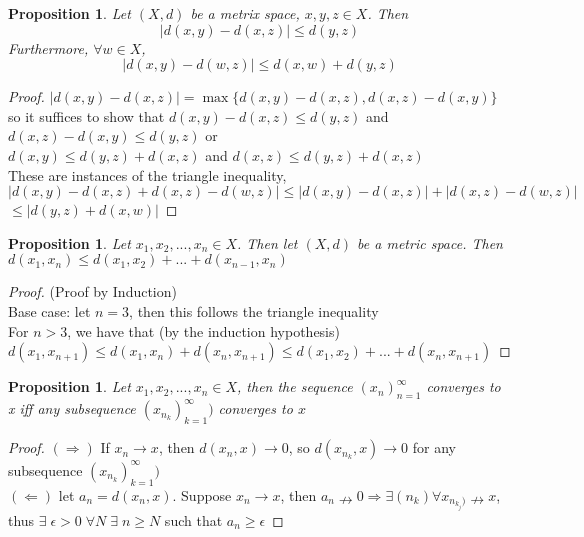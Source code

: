 \documentclass{article}
\newtheorem{proposition}[theorem]{Proposition}
\begin{document}
\begin{proposition}
    Let $(X, d)$ be a metrix space, $x, y, z \in X$. Then 
    \begin{equation}
        |d(x,y) - d(x,z)| \leq d(y,z)
    \end{equation}
    Furthermore, $\forall w \in X$,
    \begin{equation}
        |d(x,y) - d(w,z)| \leq d(x,w) + d(y,z)
    \end{equation}
\end{proposition}

\begin{proof}
    $|d(x,y) - d(x,z)| = \max\{d(x,y) - d(x,z), d(x,z) - d(x,y)\}$ so it suffices to show
    that $d(x,y) - d(x,z) \leq d(y,z)$ and $d(x,z) - d(x,y) \leq d(y,z)$ or \\
    $d(x,y) \leq d(y,z) + d(x,z)$ and $d(x,z) \leq d(y,z) + d(x,z)$ \\
    These are instances of the triangle inequality, \\
    $|d(x,y) - d(x,z) + d(x,z) -d(w,z)| \leq |d(x,y) - d(x,z)| + | d(x,z) - d(w,z)|$
    $\leq |d(y,z) + d(x,w)|$
\end{proof}

\begin{proposition}
    Let $x_1, x_2, ... , x_n \in X$. Then let $(X, d)$ be a metric space. Then
    $d(x_1, x_n) \leq d(x_1, x_2) + ... + d(x_{n-1}, x_n)$
\end{proposition}

\begin{proof}
    (Proof by Induction) \\
    Base case: let $n = 3$, then this follows the triangle inequality \checkmark\\
    For $n > 3$, we have that (by the induction hypothesis)\\
    $d(x_1, x_{n+1})\leq d(x_1, x_n)+d(x_n, x_{n+1})\leq d(x_1, x_2)+...+d(x_n, x_{n+1})$
\end{proof}

\begin{proposition}
    Let $x_1, x_2, ... , x_n \in X$, then the sequence $(x_n)_{n=1}^{\infty}$ converges
    to x iff any subsequence $(x_{n_k})_{k=1}^{\infty})$ converges to $x$
\end{proposition}

\begin{proof}
    $(\Rightarrow)$ If $x_n \rightarrow x$, then $d(x_n, x) \rightarrow 0$, so
    $d(x_{n_k}, x) \rightarrow 0$ for any subsequence $(x_{n_k})_{k=1}^{\infty})$ \\
    $(\Leftarrow)$ let $a_n = d(x_n, x)$. Suppose $x_n \rightarrow x$, then 
    $a_n \nrightarrow 0 \Rightarrow \exists (n_k) \forall x_{n_{k_j})} \nrightarrow x$,
    thus $\exists\; \epsilon > 0\; \forall N \; \exists\; n \geq N$ 
    such that $a_n \geq \epsilon$
\end{proof}
\end{document}
